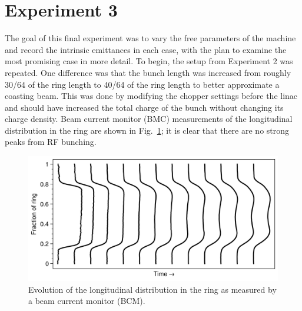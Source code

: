 \section{Experiment 3}

The goal of this final experiment was to vary the free parameters of the machine and record the intrinsic emittances in each case, with the plan to examine the most promising case in more detail. To begin, the setup from Experiment 2 was repeated. One difference was that the bunch length was increased from roughly 30/64 of the ring length to 40/64 of the ring length to better approximate a coasting beam. This was done by modifying the chopper settings before the linac and should have increased the total charge of the bunch without changing its charge density. Beam current monitor (BMC) measurements of the longitudinal distribution in the ring are shown in Fig.~\ref{fig:bcm_waterfall}; it is clear that there are no strong peaks from RF bunching.
%
\begin{figure}[!p]
    \centering
    \includegraphics[width=\textwidth]{Images/chapter5/exp3/bcm_waterfall.png}
    \caption{Evolution of the longitudinal distribution in the ring as measured by a beam current monitor (BCM).}
    \label{fig:bcm_waterfall}
\end{figure}
%

